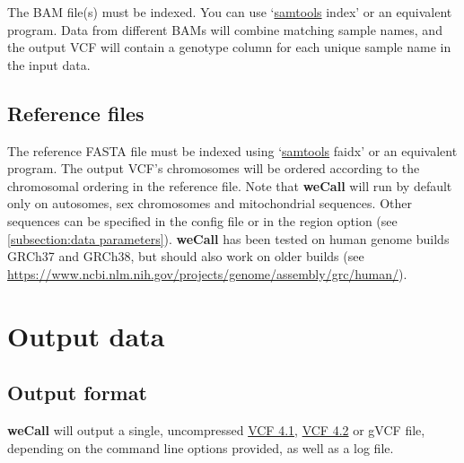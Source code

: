 \documentclass{article}
\newcommand{\wecallproduct}{\textbf{weCall}}
\begin{document}
The BAM file(s) must be indexed. You can use  `\href{http://www.htslib.org/}{samtools} index' or an equivalent program.
Data from different BAMs will combine matching sample names, and the output VCF will contain a genotype column for each unique sample name in the input data.

\subsection{Reference files}
The reference FASTA file must be indexed using `\href{http://www.htslib.org/}{samtools} faidx' or an equivalent program. The output VCF's chromosomes will be ordered according to the chromosomal ordering in the reference file. Note that  \textbf{{\wecallproduct}} will run by default only on autosomes, sex chromosomes and mitochondrial sequences. Other sequences can be specified in the config file or in the region option (see \ref{subsection:data parameters}).
 \textbf{{\wecallproduct}} has been tested on human genome builds GRCh37 and GRCh38, but should also work on older builds (see \url{https://www.ncbi.nlm.nih.gov/projects/genome/assembly/grc/human/}).

\section{Output data}
\subsection{Output format}
\textbf{{\wecallproduct}} will output a single, uncompressed \href{https://samtools.github.io/hts-specs/VCFv4.1.pdf}{VCF 4.1}, \href{https://samtools.github.io/hts-specs/VCFv4.2.pdf}{VCF 4.2} or gVCF file, depending on the command line options provided, as well as a log file.
\end{document}
